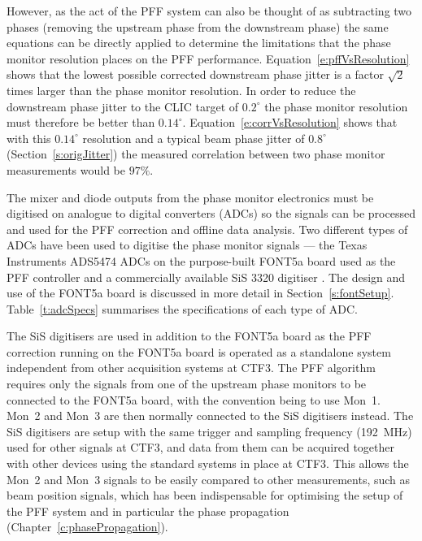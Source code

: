 However, as the act of the PFF system can also be thought of as subtracting two phases (removing the upstream phase from the downstream phase) the same equations can be directly applied to determine the limitations that the phase monitor resolution places on the PFF performance. Equation~\ref{e:pffVsResolution} shows that the lowest possible corrected downstream phase jitter is a factor \(\sqrt{2}\) times larger than the phase monitor resolution. In order to reduce the downstream phase jitter to the CLIC target of \(0.2^\circ\) the phase monitor resolution must therefore be better than \(0.14^\circ\). Equation~\ref{e:corrVsResolution} shows that with this \(0.14^\circ\) resolution and a typical beam phase jitter of \(0.8^\circ\) (Section~\ref{s:origJitter}) the measured correlation between two phase monitor measurements would be \(97\%\).


The mixer and diode outputs from the phase monitor electronics must be digitised on analogue to digital converters (ADCs) so the signals can be processed and used for the PFF correction and offline data analysis. Two different types of ADCs have been used to digitise the phase monitor signals --- the Texas Instruments ADS5474 ADCs \cite{fontADCs} on the purpose-built FONT5a board used as the PFF controller and a commercially available SiS 3320 digitiser \cite{sisDigi}. The design and use of the FONT5a board is discussed in more detail in Section~\ref{s:fontSetup}. Table~\ref{t:adcSpecs} summarises the specifications of each type of ADC. 

The SiS digitisers are used in addition to the FONT5a board as the PFF correction running on the FONT5a board is operated as a standalone system independent from other acquisition systems at CTF3. The PFF algorithm requires only the signals from one of the upstream phase monitors to be connected to the FONT5a board, with the convention being to use Mon~1. Mon~2 and Mon~3 are then normally connected to the SiS digitisers instead. The SiS digitisers are setup with the same trigger and sampling frequency (192~MHz) used for other signals at CTF3, and data from them can be acquired together with other devices using the standard systems in place at CTF3. This allows the Mon~2 and Mon~3 signals to be easily compared to other measurements, such as beam position signals, which has been indispensable for optimising the setup of the PFF system and in particular the phase propagation (Chapter~\ref{c:phasePropagation}).


